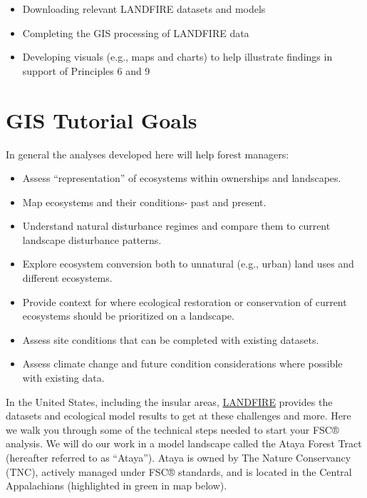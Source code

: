 \documentclass[
]{book}
\providecommand{\tightlist}{%
  \setlength{\itemsep}{0pt}\setlength{\parskip}{0pt}}
\begin{document}
\begin{itemize}
\tightlist
\item
  Downloading relevant LANDFIRE datasets and models
\item
  Completing the GIS processing of LANDFIRE data
\item
  Developing visuals (e.g., maps and charts) to help illustrate findings in support of Principles 6 and 9
\end{itemize}

\hypertarget{gis-tutorial-goals}{%
\section{GIS Tutorial Goals}\label{gis-tutorial-goals}}

In general the analyses developed here will help forest managers:

\begin{itemize}
\tightlist
\item
  Assess ``representation'' of ecosystems within ownerships and landscapes.
\item
  Map ecosystems and their conditions- past and present.
\item
  Understand natural disturbance regimes and compare them to current landscape disturbance patterns.
\item
  Explore ecosystem conversion both to unnatural (e.g., urban) land uses and different ecosystems.
\item
  Provide context for where ecological restoration or conservation of current ecosystems should be prioritized on a landscape.\\
\item
  Assess site conditions that can be completed with existing datasets.
\item
  Assess climate change and future condition considerations where possible with existing data.
\end{itemize}

In the United States, including the insular areas, \href{https://www.landfire.gov/}{LANDFIRE} provides the datasets and ecological model results to get at these challenges and more. Here we walk you through some of the technical steps needed to start your FSC® analysis. We will do our work in a model landscape called the Ataya Forest Tract (hereafter referred to as ``Ataya''). Ataya is owned by The Nature Conservancy (TNC), actively managed under FSC® standards, and is located in the Central Appalachians (highlighted in green in map below).
\end{document}
